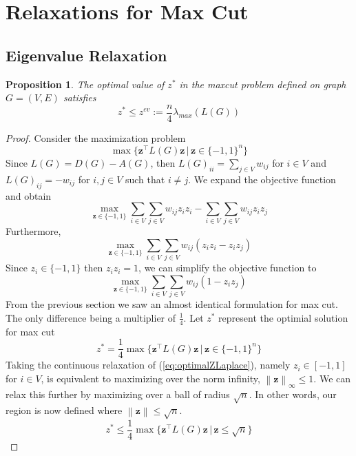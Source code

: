 \documentclass[12pt]{article}
\theoremstyle{plain}
\newtheorem{prop}{Proposition}
\theoremstyle{definition}
\newcommand{\norm}[1]{\left\lVert#1\right\rVert}
\begin{document}
\section{Relaxations for Max Cut}\label{sec:Relaxations}
\subsection{Eigenvalue Relaxation}\label{subsec:Eigenvalue}

\begin{prop}
The optimal value of $z^*$ in the maxcut problem defined on graph $G=(V,E)$ satisfies
\[
    z^* \leq z^{ev} := \dfrac{n}{4} \lambda_{max}(L(G))
\]
\end{prop}

\begin{proof}
    Consider the maximization problem 
    \[
    \max\lbrace \mathbf{z}^\top L(G) \mathbf{z}\,|\,\mathbf{z} \in \lbrace -1,1 \rbrace^n  \rbrace
    \]
    Since $L(G) = D(G) - A(G)$, then $L(G)_{ii} = \sum_{j\in V} w_{ij}$ for $i \in V$ and $L(G)_{ij} = -w_{ij}$ for $i,j \in V$ such that $i \neq j$. We expand the objective function and obtain
    \[
        \max_{\mathbf{z} \in \lbrace -1,1 \rbrace} \sum_{i \in V}\sum_{j \in V} w_{ij} z_i z_i - \sum_{i \in V}\sum_{j \in V} w_{ij}z_i z_j
    \]
    Furthermore,
    \[
        \max_{\mathbf{z} \in \lbrace -1,1 \rbrace} \sum_{i \in V} \sum_{j \in V} w_{ij} (z_i z_i - z_i z_j) 
    \]
    Since $z_i \in \lbrace -1, 1 \rbrace$ then $z_i z_i=1$, we can simplify the objective function to
    \[
        \max_{\mathbf{z} \in \lbrace -1,1 \rbrace} \sum_{i \in V} \sum_{j \in V} w_{ij} (1- z_i z_j)
    \]
    From the previous section we saw an almost identical formulation for max cut. The only difference being a multiplier of $\frac{1}{4}$. Let $z^*$ represent the optimial solution for max cut
    \begin{equation}\label{eq:optimalZLaplace}
        z^* = \frac{1}{4} \max \lbrace \mathbf{z}^\top L(G) \mathbf{z} \,|\, \mathbf{z} \in \lbrace -1,1 \rbrace^n \rbrace
    \end{equation}
    Taking the continuous relaxation of (\ref{eq:optimalZLaplace}), namely $z_i \in \left[-1,1 \right]$ for $i \in V$, is equivalent to maximizing
    over the norm infinity, $\norm{\mathbf{z}}_\infty \leq 1$. We can relax this further by maximizing over a ball of radius $\sqrt{n}$. In other words,
    our region is now defined where $\norm{\mathbf{z}} \leq \sqrt{n}$. 
    \begin{equation}
    z^* \leq \frac{1}{4} \max \lbrace \mathbf{z}^\top L(G) \mathbf{z} \,|\, \mathbf{z} \leq \sqrt{n} \rbrace

\end{equation}
\end{proof}
\end{document}
